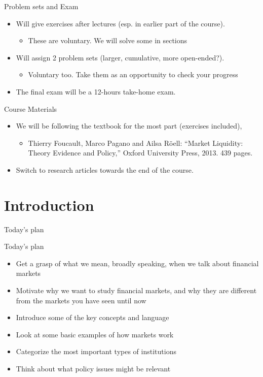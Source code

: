 \begin{frame}{Problem sets and Exam}
\begin{itemize}
	\item Will give exercises after lectures (esp. in earlier part of the course).
	\begin{itemize}
		\item These are voluntary. We will solve some in sections
	\end{itemize}
	\item Will assign 2 problem sets (larger, cumulative, more open-ended?).
	\begin{itemize}
		\item Voluntary too. Take them as an opportunity to check your progress
	\end{itemize}
	\item The final exam will be a 12-hours take-home exam.
\end{itemize}
\end{frame}


\begin{frame}{Course Materials}
\begin{itemize}
	\item We will be following the textbook for the most part (exercises included),
	\begin{itemize}
		\item Thierry Foucault, Marco Pagano and Ailsa R{\"o}ell: “Market Liquidity: Theory Evidence and Policy,” Oxford University Press, 2013. 439 pages.
	\end{itemize}
	\item Switch to research articles towards the end of the course.
\end{itemize}
\end{frame}




\section{Introduction}

\begin{frame}{Today's plan}
\tableofcontents[currentsection]
\end{frame}


\begin{frame}{Today's plan}
\begin{itemize}
	\item Get a grasp of what we mean, broadly speaking, when we talk about financial markets
	\item Motivate why we want to study financial markets, and why they are different from the markets you have seen until now
	\item Introduce some of the key concepts and language
	\item Look at some basic examples of how markets work
	\item Categorize the most important types of institutions
	\item Think about what policy issues might be relevant
\end{itemize}
\end{frame}


